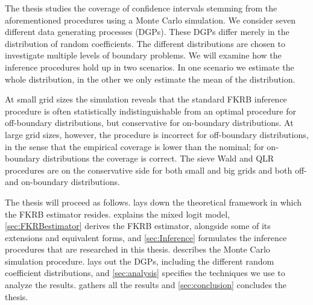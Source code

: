 The thesis studies the coverage of confidence intervals stemming from the aforementioned procedures using a Monte Carlo simulation.
We consider seven different data generating processes (DGPs).
These DGPs differ merely in the distribution of random coefficients.
The different distributions are chosen to investigate multiple levels of boundary problems.
We will examine how the inference procedures hold up in two scenarios.
In one scenario we estimate the whole distribution, in the other we only estimate the mean of the distribution.

At small grid sizes the simulation reveals that the standard FKRB inference procedure is often statistically indistinguishable from an optimal procedure for off-boundary distributions, but conservative for on-boundary distributions.
At large grid sizes, however, the procedure is incorrect for off-boundary distributions, in the sense that the empirical coverage is lower than the nominal; for on-boundary distributions the coverage is correct.
The sieve Wald and QLR procedures are on the conservative side for both small and big grids and both off- and on-boundary distributions.

The thesis will proceed as follows. 
 lays down the theoretical framework in which the FKRB estimator resides.
 explains the mixed logit model, \cref{sec:FKRBestimator} derives the FKRB estimator, alongside some of its extensions and equivalent forms, and \cref{sec:Inference} formulates the inference procedures that are researched in this thesis.
 describes the Monte Carlo simulation procedure.
 lays out the DGPs, including the different random coefficient distributions, and \cref{sec:analysis} specifies the techniques we use to analyze the results.
 gathers all the results and \cref{sec:conclusion} concludes the thesis.
